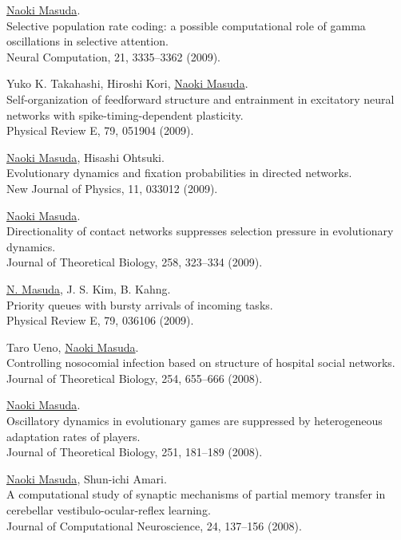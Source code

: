 \documentclass[11pt,letter]{article}
\begin{document}
\begin{etaremune}
\item \underline{Naoki Masuda}.\\
Selective population rate coding: a possible computational role of gamma oscillations in selective attention.\\
Neural Computation, 21, 3335--3362 (2009).

\item Yuko K. Takahashi, Hiroshi Kori, \underline{Naoki Masuda}.\\
Self-organization of feedforward structure and entrainment in excitatory neural networks with spike-timing-dependent plasticity.\\
Physical Review E, 79, 051904 (2009).

\item \underline{Naoki Masuda}, Hisashi Ohtsuki.\\
Evolutionary dynamics and fixation probabilities in directed networks.\\
New Journal of Physics, 11, 033012 (2009).

\item \underline{Naoki Masuda}.\\
Directionality of contact networks suppresses selection pressure in evolutionary dynamics.\\
Journal of Theoretical Biology, 258, 323--334 (2009).

\item \underline{N. Masuda}, J. S. Kim, B. Kahng.\\
Priority queues with bursty arrivals of incoming tasks.\\
Physical Review E, 79, 036106 (2009).

\item Taro Ueno, \underline{Naoki Masuda}.\\
Controlling nosocomial infection based on structure of hospital social networks.\\
Journal of Theoretical Biology, 254, 655--666 (2008).

\item \underline{Naoki Masuda}.\\
Oscillatory dynamics in evolutionary games are suppressed by heterogeneous adaptation rates of players.\\
Journal of Theoretical Biology, 251, 181--189 (2008).

\item \underline{Naoki Masuda}, Shun-ichi Amari.\\
A computational study of synaptic mechanisms of partial memory transfer in cerebellar vestibulo-ocular-reflex learning.\\
Journal of Computational Neuroscience, 24, 137--156 (2008).


\end{etaremune}
\end{document}
